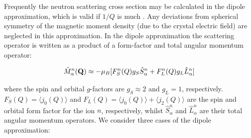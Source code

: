 Frequently the neutron scattering cross section may be calculated 
in the dipole
approximation, which is valid if $1/Q$ is much 
. 
 Any deviations from spherical symmetry of the magnetic moment density
(due to the crystal electric field) are neglected in this approximation.
In the dipole approximation the scattering operator is written as a product of a form-factor and total angular momentum %
operator: 



\begin{equation}
\hat M^{n}_{\alpha}(\mathbf Q) \approx -\mu_B[F^n_S(Q) g_S \hat S^{n}_{\alpha} + F^n_L(Q) g_L \hat L^{n}_{\alpha}]
\end{equation}
 
\noindent where the spin and orbital $g$-factors 
are $g_S \approx 2$ and $g_L=1$, respectively. $F_S(Q)=\langle j_0 (Q) \rangle$ and
 $F_L(Q)=\langle j_0 (Q) \rangle + \langle j_2 (Q) \rangle$ are the spin and orbital form factor for the ion $n$, %
respectively, whilst $\hat S^{n}_{\alpha}$ and $\hat L^{n}_{\alpha}$ are their total angular momentum operators. We %
consider
three cases of the dipole approximation:

